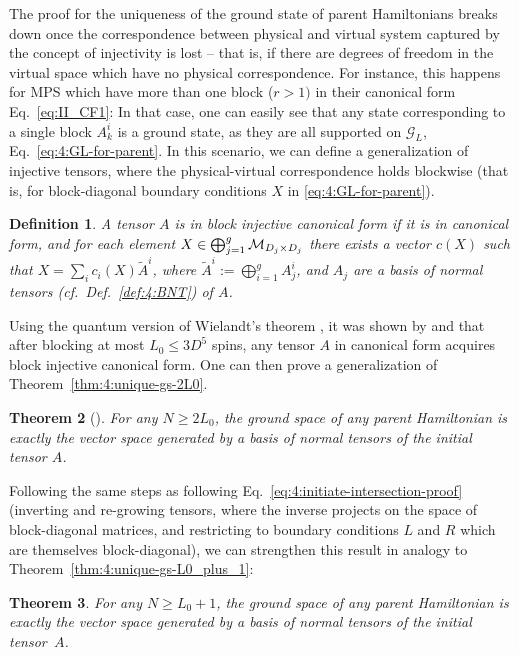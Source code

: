 \documentclass[rmp,aps,reprint,superscriptaddress,nobalancelastpage]{revtex4-1}
\newtheorem{thm}{Theorem}[section]
\newtheorem{defn}[thm]{Definition}
\begin{document}
The proof for the uniqueness of the ground state of parent Hamiltonians breaks down once the correspondence between physical and virtual system captured by the concept of injectivity is lost -- that is, if there are degrees of freedom in the virtual space which have no physical correspondence.
For instance, this happens for MPS which have more than one block ($r>1)$ in their  canonical form
Eq.~\eqref{eq:II_CF1}: In that case, one can easily see that any state corresponding to a single block
$A_k^i$ is a ground state, as they are all supported on $\mathcal G_L$, Eq.~\eqref{eq:4:GL-for-parent}.
In this scenario, we can define a generalization of injective tensors, where
the physical-virtual correspondence holds blockwise (that is, for block-diagonal boundary conditions $X$ in \eqref{eq:4:GL-for-parent}).
\begin{defn}
    A tensor $A$ is in \emph{block injective canonical form} if it is in canonical form, and for each element $X\in \bigoplus_{j=1}^g {\cal M}_{D_j\times D_j}$ there exists a vector $c(X)$ such that
    $X=\sum_i c_i(X) \tilde A^i$, where $\tilde A^i:=\bigoplus_{i=1}^g A^i_j$, and $A_j$ are a basis of normal tensors
    (cf.\ Def.~\ref{def:4:BNT}) of $A$.
\end{defn}
\noindent
Using the quantum version of Wielandt's theorem \cite{sanz:wielandt}, it was shown by \citet{perez-garcia:mps-reps} and \citet{cirac:mpdo-rgfp}
that after blocking at most $L_0\le 3D^5$ spins, any tensor $A$ in canonical form acquires block injective canonical form.  One can then  prove
a generalization of Theorem~\ref{thm:4:unique-gs-2L0}.
\begin{thm}[\citet{fannes:FCS,perez-garcia:mps-reps}]
    For any $N\ge 2L_0$, the ground space of any parent Hamiltonian is exactly the vector space generated by a basis of normal tensors  of the initial tensor $A$.
\end{thm}
Following the same steps as following Eq.~\eqref{eq:4:initiate-intersection-proof} (inverting and re-growing tensors, where the inverse projects on the space of block-diagonal matrices, and restricting to boundary conditions $L$ and $R$ which are themselves block-diagonal), we can strengthen this result in analogy to Theorem~\ref{thm:4:unique-gs-L0_plus_1}:
\begin{thm}
    For any $N\ge L_0+1$, the ground space of any parent Hamiltonian is exactly the vector space generated by a basis of normal tensors  of the initial tensor~$A$.
\end{thm}
\end{document}
